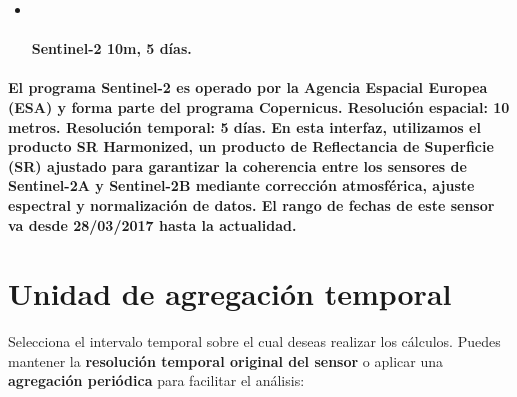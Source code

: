 \documentclass[
]{book}
\begin{document}
\begin{itemize}
\item ~
  \subsubsection{\texorpdfstring{\textbf{Sentinel-2 10m, 5 días}.}{Sentinel-2 10m, 5 días.}}\label{sentinel-2-10m-5-duxedas.}
\end{itemize}

\subsubsection{\texorpdfstring{El programa \textbf{Sentinel-2} es operado por la Agencia Espacial Europea (ESA) y forma parte del programa Copernicus. \textbf{Resolución espacial:} 10 metros. \textbf{Resolución temporal:} 5 días. En esta interfaz, utilizamos el producto SR Harmonized, un producto de Reflectancia de Superficie (SR) ajustado para garantizar la coherencia entre los sensores de Sentinel-2A y Sentinel-2B mediante corrección atmosférica, ajuste espectral y normalización de datos. El \textbf{rango de fechas} de este sensor va desde \textbf{28/03/2017 hasta la actualidad.}}{El programa Sentinel-2 es operado por la Agencia Espacial Europea (ESA) y forma parte del programa Copernicus. Resolución espacial: 10 metros. Resolución temporal: 5 días. En esta interfaz, utilizamos el producto SR Harmonized, un producto de Reflectancia de Superficie (SR) ajustado para garantizar la coherencia entre los sensores de Sentinel-2A y Sentinel-2B mediante corrección atmosférica, ajuste espectral y normalización de datos. El rango de fechas de este sensor va desde 28/03/2017 hasta la actualidad.}}\label{el-programa-sentinel-2-es-operado-por-la-agencia-espacial-europea-esa-y-forma-parte-del-programa-copernicus.-resoluciuxf3n-espacial-10-metros.-resoluciuxf3n-temporal-5-duxedas.-en-esta-interfaz-utilizamos-el-producto-sr-harmonized-un-producto-de-reflectancia-de-superficie-sr-ajustado-para-garantizar-la-coherencia-entre-los-sensores-de-sentinel-2a-y-sentinel-2b-mediante-correcciuxf3n-atmosfuxe9rica-ajuste-espectral-y-normalizaciuxf3n-de-datos.-el-rango-de-fechas-de-este-sensor-va-desde-28032017-hasta-la-actualidad.}

\chapter{Unidad de agregación temporal}\label{ud-agregacion-temporal}

Selecciona el intervalo temporal sobre el cual deseas realizar los cálculos. Puedes mantener la \textbf{resolución temporal original del sensor} o aplicar una \textbf{agregación periódica} para facilitar el análisis:
\end{document}
